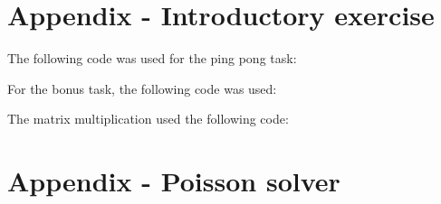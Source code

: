 \section*{Appendix - Introductory exercise}
\label{app:pingpong}
The following code was used for the ping pong task:

For the bonus task, the following code was used:


\label{app:mm}
The matrix multiplication used the following code: 


\section*{Appendix - Poisson solver}

